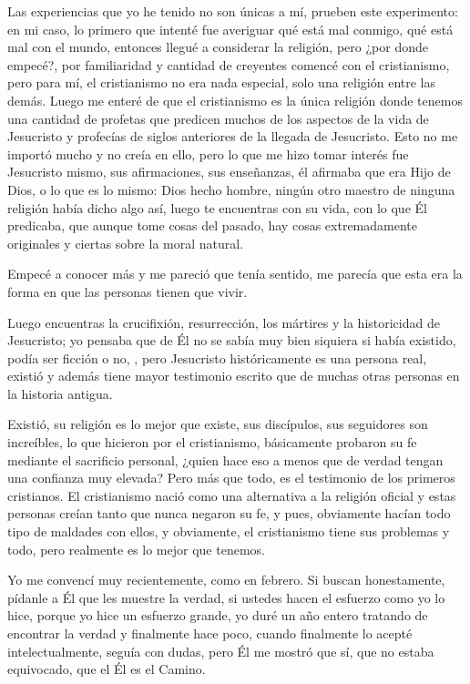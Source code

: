 \documentclass[12pt]{article}
\begin{document}
	Las experiencias que yo he tenido no son únicas a mí, prueben este
	experimento: en mi caso, lo primero que intenté fue averiguar qué está
	mal conmigo, qué está mal con el mundo, entonces llegué a considerar la
	religión, pero ¿por donde empecé?, por familiaridad y cantidad de
	creyentes comencé con el cristianismo, pero para mí, el cristianismo no
	era nada especial, solo una religión entre las demás. Luego me enteré de
	que el cristianismo es la única religión donde tenemos una cantidad de
	profetas que predicen muchos de los aspectos de la vida de Jesucristo y
	profecías de siglos anteriores de la llegada de Jesucristo. Esto no me
	importó mucho y no creía en ello, pero lo que me hizo tomar interés fue
	Jesucristo mismo, sus afirmaciones, sus enseñanzas, él afirmaba que era
	Hijo de Dios, o lo que es lo mismo: Dios hecho hombre, ningún otro
	maestro de ninguna religión había dicho algo así, luego te encuentras
	con su vida, con lo que Él predicaba, que aunque tome cosas del pasado,
	hay cosas extremadamente originales y ciertas sobre la moral natural.

	Empecé a conocer más y me pareció que tenía sentido, me parecía que esta
	era la forma en que las personas tienen que vivir. 

	Luego encuentras la crucifixión, resurrección, los mártires y la
	historicidad de Jesucristo; yo pensaba que de Él no se sabía muy bien
	siquiera si había existido, podía ser ficción o no, , pero Jesucristo históricamente es una persona
	real, existió y además tiene mayor testimonio escrito que de muchas
	otras personas en la historia antigua.

	Existió, su religión es lo mejor que existe, sus discípulos, sus
	seguidores son increíbles, lo que hicieron por el cristianismo,
	básicamente probaron su fe mediante el sacrificio personal, ¿quien hace
	eso a menos que de verdad tengan una confianza muy elevada? Pero más que
	todo, es el testimonio de los primeros cristianos. El cristianismo nació
	como una  alternativa a la religión oficial y estas
	personas creían tanto que nunca negaron su fe, y pues, obviamente hacían
	todo tipo de maldades con ellos, y obviamente, el cristianismo tiene
	sus problemas y todo, pero realmente es lo mejor que tenemos.
	
	Yo me convencí muy recientemente, como en febrero. Si buscan
	honestamente, pídanle a Él que les muestre la verdad, si ustedes hacen
	el esfuerzo como yo lo hice, porque yo hice un esfuerzo grande, yo duré
	un año entero tratando de encontrar la verdad y finalmente hace poco,
	cuando finalmente lo acepté intelectualmente, seguía con dudas, pero Él
	me mostró que sí, que no estaba equivocado, que el Él es el Camino.
\end{document}
